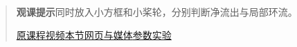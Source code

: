 \begin{quote}\small\textbf{观课提示}\quad 同时放入小方框和小桨轮，分别判断净流出与局部环流。

\href{https://www.youtube.com/watch?v=rB83DpBJQsE}{原课程视频}\quad\href{https://vitael04213.github.io/3blue1brown-notes/lessons/divergence-and-curl.html}{本节网页与媒体}\quad\href{https://vitael04213.github.io/3blue1brown-notes/lab.html\#phase}{参数实验}
\end{quote}
